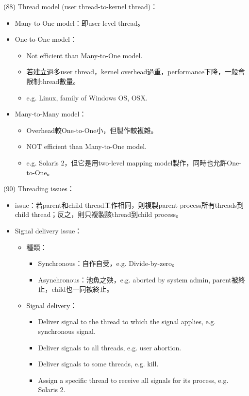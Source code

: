 \begin{theorem}{(88)} Thread model (user thread-to-kernel thread)：\begin{itemize}
        \item Many-to-One model：即user-level thread。
        \item One-to-One model：\begin{itemize}
            \item Not efficient than Many-to-One model.
            \item 若建立過多user thread，kernel overhead過重，performance下降，一般會限制thread數量。
            \item e.g. Linux, family of Windows OS, OSX.
        \end{itemize}
        \item Many-to-Many model：\begin{itemize}
            \item Overhead較One-to-One小，但製作較複雜。
            \item NOT efficient than Many-to-One model.
            \item e.g. Solaris 2，但它是用two-level mapping model製作，同時也允許One-to-One。
        \end{itemize}
    \end{itemize}
\end{theorem}

\begin{theorem}{(90)} Threading issues：\begin{itemize}
        \item {} issue：若parent和child thread工作相同，則複製parent process所有threads到child thread；反之，則只複製該thread到child process。
        \item Signal delivery issue： \begin{itemize}
            \item 種類：\begin{itemize}
                \item Synchronous：自作自受，e.g. Divide-by-zero。
                \item Asynchronous：池魚之殃，e.g. aborted by system admin, parent被終止，child也一同被終止。
            \end{itemize}
            \item Signal delivery：\begin{itemize}
                \item Deliver signal to the thread to which the signal applies, e.g. synchronous signal.
                \item Deliver signals to all threads, e.g. user abortion.
                \item Deliver signals to some threads, e.g. kill.
                \item Assign a specific thread to receive all signals for its process, e.g. Solaris 2. 
            \end{itemize}
        \end{itemize}
    \end{itemize}
\end{theorem}

